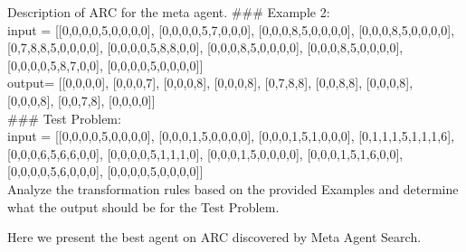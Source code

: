 \documentclass{article}
\newcommand{\ouralgo}{Meta Agent Search\xspace}
\begin{document}
\begin{mybox}{Description of ARC for the meta agent.}
\#\#\# Example 2:\\
input = [[0,0,0,0,5,0,0,0,0], [0,0,0,0,5,7,0,0,0], [0,0,0,8,5,0,0,0,0], [0,0,0,8,5,0,0,0,0], [0,7,8,8,5,0,0,0,0], [0,0,0,0,5,8,8,0,0], [0,0,0,8,5,0,0,0,0], [0,0,0,8,5,0,0,0,0], [0,0,0,0,5,8,7,0,0], [0,0,0,0,5,0,0,0,0]]\\
output= [[0,0,0,0], [0,0,0,7], [0,0,0,8], [0,0,0,8], [0,7,8,8], [0,0,8,8], [0,0,0,8], [0,0,0,8], [0,0,7,8], [0,0,0,0]]\\

\#\#\# Test Problem:\\
input = [[0,0,0,0,5,0,0,0,0], [0,0,0,1,5,0,0,0,0], [0,0,0,1,5,1,0,0,0], [0,1,1,1,5,1,1,1,6], [0,0,0,6,5,6,6,0,0], [0,0,0,0,5,1,1,1,0], [0,0,0,1,5,0,0,0,0], [0,0,0,1,5,1,6,0,0], [0,0,0,0,5,6,0,0,0], [0,0,0,0,5,0,0,0,0]]\\

Analyze the transformation rules based on the provided Examples and determine what the output should be for the Test Problem.\\
\end{mybox}

Here we present the best agent on ARC discovered by \ouralgo.
\end{document}
